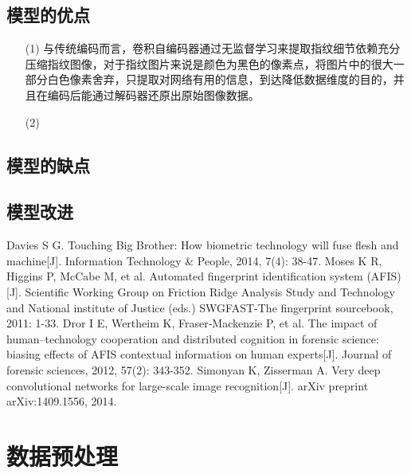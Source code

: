 \documentclass{whutmod}
\begin{document}
		\subsection{模型的优点}
			\begin{itemize}                                             
			\item [(1)] 与传统编码而言，卷积自编码器通过无监督学习来提取指纹细节依赖充分压缩指纹图像，对于指纹图片来说是颜色为黑色的像素点，将图片中的很大一部分白色像素舍弃，只提取对网络有用的信息，到达降低数据维度的目的，并且在编码后能通过解码器还原出原始图像数据。
			\item [(2)] 	
			\end{itemize}
		\subsection{模型的缺点}

  		\subsection{模型改进}

  
  
 
	\newpage	%
	\nocite{*}		%
	\begin{thebibliography}{9}%
		Davies S G. Touching Big Brother: How biometric technology will fuse flesh and machine[J]. Information Technology \& People, 2014, 7(4): 38-47.
	Moses K R, Higgins P, McCabe M, et al. Automated fingerprint identification system (AFIS)[J]. Scientific Working Group on Friction Ridge Analysis Study and Technology and National institute of Justice (eds.) SWGFAST-The fingerprint sourcebook, 2011: 1-33.
	Dror I E, Wertheim K, Fraser‐Mackenzie P, et al. The impact of human–technology cooperation and distributed cognition in forensic science: biasing effects of AFIS contextual information on human experts[J]. Journal of forensic sciences, 2012, 57(2): 343-352.
	Simonyan K, Zisserman A. Very deep convolutional networks for large-scale image recognition[J]. arXiv preprint arXiv:1409.1556, 2014.
	\end{thebibliography}

	\newpage
	\appendix %
	\section{数据预处理}
\end{document}
